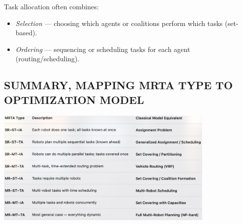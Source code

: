Task allocation often combines:
\begin{itemize}
    \item \textit{Selection} — choosing which agents or coalitions perform which tasks (set-based).
    \item \textit{Ordering} — sequencing or scheduling tasks for each agent (routing/scheduling).
\end{itemize}


\subsection*{SUMMARY, MAPPING MRTA TYPE TO OPTIMIZATION MODEL}

\begin{center}
    \includegraphics[width=0.8\textwidth]{../images/MRTA_Summary.png}
\end{center}
